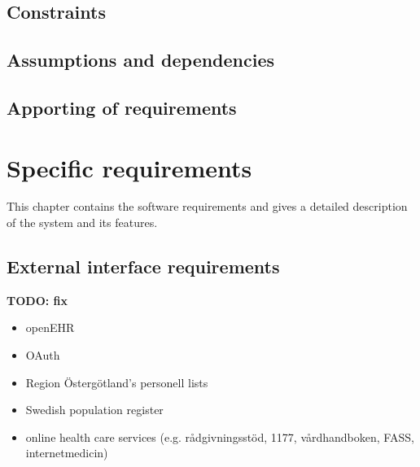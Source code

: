 \documentclass{scrreprt}
\begin{document}
\section{Constraints}


\section{Assumptions and dependencies}

\section{Apporting of requirements}

\chapter{Specific requirements}
This chapter contains the software requirements and gives a detailed
description of the system and its features. 

\section{External interface requirements}
\textbf{TODO: fix}
\begin{itemize}
    \item openEHR
    \item OAuth
    \item Region Östergötland's personell lists 
    \item Swedish population register 
    \item online health care services (e.g. rådgivningsstöd, 1177, vårdhandboken, FASS, internetmedicin) 
\end{itemize}

\end{document}
